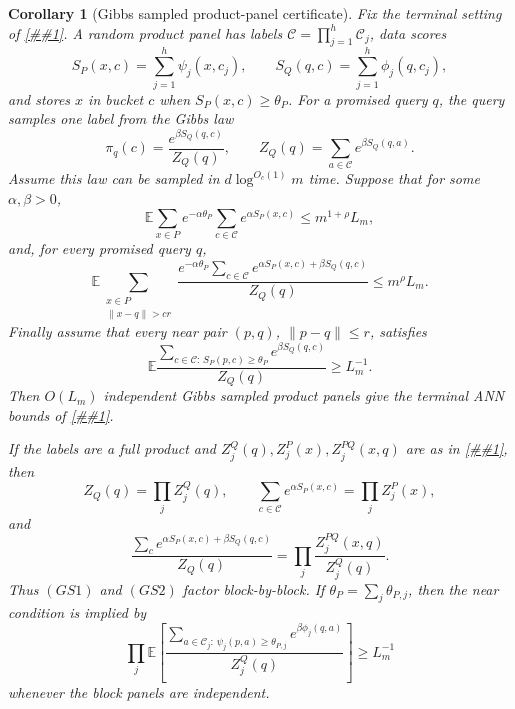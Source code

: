 \documentclass[10pt]{article}
\newcommand{\cref}[1]{\ref{##1}}
\newtheorem{corollary}[theorem]{Corollary}
\theoremstyle{definition}
\newcommand{\E}{\mathbb{E}}
\begin{document}
\begin{corollary}[Gibbs sampled product-panel certificate]
   \label{cor:gibbs-sampled-product-panel}
   Fix the terminal setting of \cref{prop:sampled-structured-panel}.  A random
   product panel has labels
   \(\mathcal C=\prod_{j=1}^h\mathcal C_j\), data scores
   \[
      S_P(x,c)=\sum_{j=1}^h\psi_j(x,c_j),
      \qquad
      S_Q(q,c)=\sum_{j=1}^h\phi_j(q,c_j),
   \]
   and stores \(x\) in bucket \(c\) when \(S_P(x,c)\ge\theta_P\).  For a
   promised query \(q\), the query samples one label from the Gibbs law
   \[
      \pi_q(c)=\frac{e^{\beta S_Q(q,c)}}{Z_Q(q)},
      \qquad
      Z_Q(q)=\sum_{a\in\mathcal C}e^{\beta S_Q(q,a)}.
   \]
   Assume this law can be sampled in \(d\log^{O_c(1)}m\) time.  Suppose that
   for some \(\alpha,\beta>0\),
   \[
      \E
      \sum_{x\in P}
      e^{-\alpha\theta_P}
      \sum_{c\in\mathcal C}e^{\alpha S_P(x,c)}
      \le m^{1+\rho}L_m,
      \tag{GS1}
   \]
   and, for every promised query \(q\),
   \[
      \E
      \sum_{\substack{x\in P\\ \|x-q\|>cr}}
      \frac{
         e^{-\alpha\theta_P}
         \sum_{c\in\mathcal C}
         e^{\alpha S_P(x,c)+\beta S_Q(q,c)}
      }{Z_Q(q)}
      \le m^\rho L_m .
      \tag{GS2}
   \]
   Finally assume that every near pair \((p,q)\), \(\|p-q\|\le r\), satisfies
   \[
      \E
      \frac{
         \sum_{c\in\mathcal C:\,S_P(p,c)\ge\theta_P}
         e^{\beta S_Q(q,c)}
      }{Z_Q(q)}
      \ge L_m^{-1}.
      \tag{GS3}
   \]
   Then \(O(L_m)\) independent Gibbs sampled product panels give the terminal
   ANN bounds of \cref{prop:sampled-structured-panel}.

   If the labels are a full product and
   \(Z_j^Q(q),Z_j^P(x),Z_j^{PQ}(x,q)\) are as in
   \cref{lem:product-panel-tensorization}, then
   \[
      Z_Q(q)=\prod_jZ_j^Q(q),
      \qquad
      \sum_{c\in\mathcal C}e^{\alpha S_P(x,c)}
      =\prod_jZ_j^P(x),
   \]
   and
   \[
      \frac{
         \sum_c e^{\alpha S_P(x,c)+\beta S_Q(q,c)}
      }{Z_Q(q)}
      =
      \prod_j\frac{Z_j^{PQ}(x,q)}{Z_j^Q(q)}.
      \tag{GS4}
   \]
   Thus \((GS1)\) and \((GS2)\) factor block-by-block.  If
   \(\theta_P=\sum_j\theta_{P,j}\), then the near condition is implied by
   \[
      \prod_j
      \E\left[
      \frac{
         \sum_{a\in\mathcal C_j:\,\psi_j(p,a)\ge\theta_{P,j}}
         e^{\beta\phi_j(q,a)}
      }{Z_j^Q(q)}
      \right]
      \ge L_m^{-1}
      \tag{GS5}
   \]
   whenever the block panels are independent.
\end{corollary}
\end{document}
